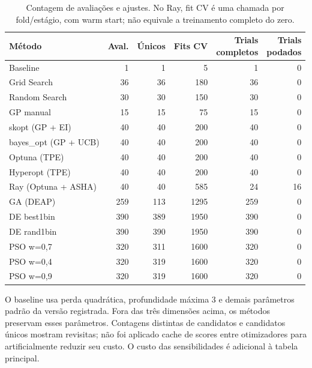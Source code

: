 \documentclass[12pt,a4paper]{article}
\begin{document}
\begin{table}[H]
\centering
\caption{Contagem de avaliações e ajustes. No Ray, fit CV é uma chamada por fold/estágio, com warm start; não equivale a treinamento completo do zero.}
\footnotesize
\setlength{\tabcolsep}{4.5pt}
\renewcommand{\arraystretch}{1.16}
\begin{adjustbox}{max width=\linewidth}
\begin{tabular}{@{}lrrrrr@{}}
\toprule
Método & Aval. & Únicos & Fits CV & \shortstack[r]{Trials\\completos} & \shortstack[r]{Trials\\podados} \\
\midrule
Baseline & 1 & 1 & 5 & 1 & 0 \\
Grid Search & 36 & 36 & 180 & 36 & 0 \\
Random Search & 30 & 30 & 150 & 30 & 0 \\
GP manual & 15 & 15 & 75 & 15 & 0 \\
skopt (GP + EI) & 40 & 40 & 200 & 40 & 0 \\
\addlinespace[3pt]
bayes\_opt (GP + UCB) & 40 & 40 & 200 & 40 & 0 \\
Optuna (TPE) & 40 & 40 & 200 & 40 & 0 \\
Hyperopt (TPE) & 40 & 40 & 200 & 40 & 0 \\
Ray (Optuna + ASHA) & 40 & 40 & 585 & 24 & 16 \\
GA (DEAP) & 259 & 113 & 1295 & 259 & 0 \\
\addlinespace[3pt]
DE best1bin & 390 & 389 & 1950 & 390 & 0 \\
DE rand1bin & 390 & 390 & 1950 & 390 & 0 \\
PSO w=0,7 & 320 & 311 & 1600 & 320 & 0 \\
PSO w=0,4 & 320 & 319 & 1600 & 320 & 0 \\
PSO w=0,9 & 320 & 319 & 1600 & 320 & 0 \\
\bottomrule
\end{tabular}
\end{adjustbox}
\end{table}

O baseline usa perda quadrática, profundidade máxima 3 e demais parâmetros padrão da versão registrada. Fora das três dimensões acima, os métodos preservam esses parâmetros. Contagens distintas de candidatos e candidatos únicos mostram revisitas; não foi aplicado cache de scores entre otimizadores para artificialmente reduzir seu custo. O custo das sensibilidades é adicional à tabela principal.
\end{document}
